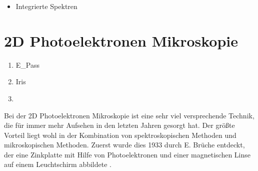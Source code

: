         \begin{itemize}
            \item Integrierte Spektren
        \end{itemize}


    \section{2D Photoelektronen Mikroskopie} \label{sec:2D-PES}
    \begin{enumerate}
        \item E_Pass
        \item Iris
        \item 
    \end{enumerate}
        Bei der 2D Photoelektronen Mikroskopie ist eine sehr viel versprechende Technik, die für immer mehr Aufsehen in den letzten Jahren gesorgt hat.
        Der größte Vorteil liegt wohl in der Kombination von spektroskopischen Methoden und mikroskopischen Methoden.
        Zuerst wurde dies 1933 durch E. Brüche entdeckt, der eine Zinkplatte mit Hilfe von Photoelektronen und einer magnetischen Linse auf einem Leuchtschirm abbildete \cite{bruche_elektronenmikroskopische_1933}.

